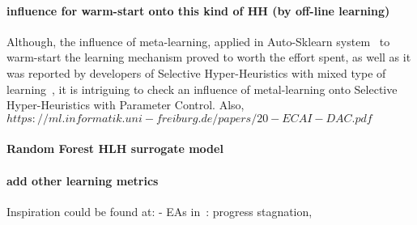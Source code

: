 \paragraph{influence for warm-start onto this kind of HH (by off-line learning)}
Although, the influence of meta-learning, applied in Auto-Sklearn system~\cite{feurer2015efficient} to warm-start the learning mechanism proved to worth the effort spent, as well as it was reported by developers of Selective Hyper-Heuristics with mixed type of learning~\cite{uludaug2013hybrid,}, it is intriguing to check an influence of metal-learning onto Selective Hyper-Heuristics with Parameter Control.
Also, $https://ml.informatik.uni-freiburg.de/papers/20-ECAI-DAC.pdf$

\paragraph{Random Forest HLH surrogate model}

\paragraph{add other learning metrics}
Inspiration could be found at:
- EAs in~\cite{karafotias2014generic}: progress stagnation, 

